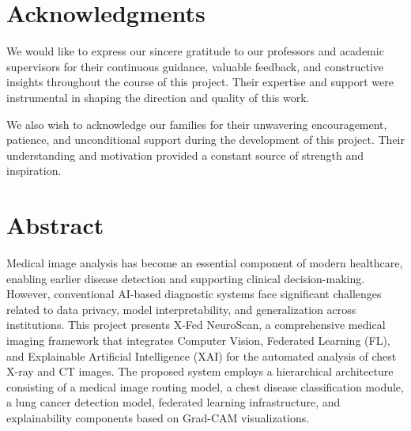 \documentclass[openany, 12pt]{book}
\begin{document}
	
	\pagestyle{style1}
	{\titleformat{\chapter}[block]
		{\normalfont\Huge\bfseries\centering\color{RoyalBlue}}{\thechapter}{1em}{}
		
		\setcounter{page}{1}
		\chapter*{Acknowledgments}
		We would like to express our sincere gratitude to our professors and academic supervisors for their continuous guidance, valuable feedback, and constructive insights throughout the course of this project. Their expertise and support were instrumental in shaping the direction and quality of this work.
		
		We also wish to acknowledge our families for their unwavering encouragement, patience, and unconditional support during the development of this project. Their understanding and motivation provided a constant source of strength and inspiration.
		
		\chapter*{Abstract}
			Medical image analysis has become an essential component of modern healthcare, enabling earlier disease detection and supporting clinical decision-making. However, conventional AI-based diagnostic systems face significant challenges related to data privacy, model interpretability, and generalization across institutions. This project presents X-Fed NeuroScan, a comprehensive medical imaging framework that integrates Computer Vision, Federated Learning (FL), and Explainable Artificial Intelligence (XAI) for the automated analysis of chest X-ray and CT images. The proposed system employs a hierarchical architecture consisting of a medical image routing model, a chest disease classification module, a lung cancer detection model, federated learning infrastructure, and explainability components based on Grad-CAM visualizations.
			
}
\end{document}
